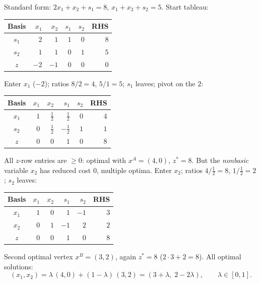 \begin{solutions}
  \item Standard form: $2x_1+x_2+s_1=8$, $x_1+x_2+s_2=5$. Start tableau:
        \begin{center}
        \begin{tabular}{c|rrrr|r}
        \hline
        Basis & $x_1$ & $x_2$ & $s_1$ & $s_2$ & RHS\\
        \hline
        $s_1$ & $2$ & $1$ & $1$ & $0$ & $8$\\
        $s_2$ & $1$ & $1$ & $0$ & $1$ & $5$\\
        \hline
        $z$ & $-2$ & $-1$ & $0$ & $0$ & $0$\\
        \hline
        \end{tabular}
        \end{center}
        Enter $x_1$ ($-2$); ratios $8/2=4$, $5/1=5$; $s_1$ leaves; pivot
        on the $2$:
        \begin{center}
        \begin{tabular}{c|rrrr|r}
        \hline
        Basis & $x_1$ & $x_2$ & $s_1$ & $s_2$ & RHS\\
        \hline
        $x_1$ & $1$ & $\tfrac{1}{2}$ & $\tfrac{1}{2}$ & $0$ & $4$\\
        $s_2$ & $0$ & $\tfrac{1}{2}$ & $-\tfrac{1}{2}$ & $1$ & $1$\\
        \hline
        $z$ & $0$ & $0$ & $1$ & $0$ & $8$\\
        \hline
        \end{tabular}
        \end{center}
        All $z$-row entries are $\ge 0$: optimal with $x^{A}=(4,0)$,
        $z^{*}=8$. But the \emph{nonbasic} variable $x_2$ has reduced cost
        $0$, multiple optima. Enter $x_2$; ratios
        $4/\tfrac{1}{2}=8$, $1/\tfrac{1}{2}=2$; $s_2$ leaves:
        \begin{center}
        \begin{tabular}{c|rrrr|r}
        \hline
        Basis & $x_1$ & $x_2$ & $s_1$ & $s_2$ & RHS\\
        \hline
        $x_1$ & $1$ & $0$ & $1$ & $-1$ & $3$\\
        $x_2$ & $0$ & $1$ & $-1$ & $2$ & $2$\\
        \hline
        $z$ & $0$ & $0$ & $1$ & $0$ & $8$\\
        \hline
        \end{tabular}
        \end{center}
        Second optimal vertex $x^{B}=(3,2)$, again $z^{*}=8$
        ($2\cdot 3+2=8$). All optimal solutions:
        \[
          (x_1,x_2)=\lambda\,(4,0)+(1-\lambda)\,(3,2)
                   =(3+\lambda,\;2-2\lambda),\qquad \lambda\in[0,1].
        \]


\end{solutions}
